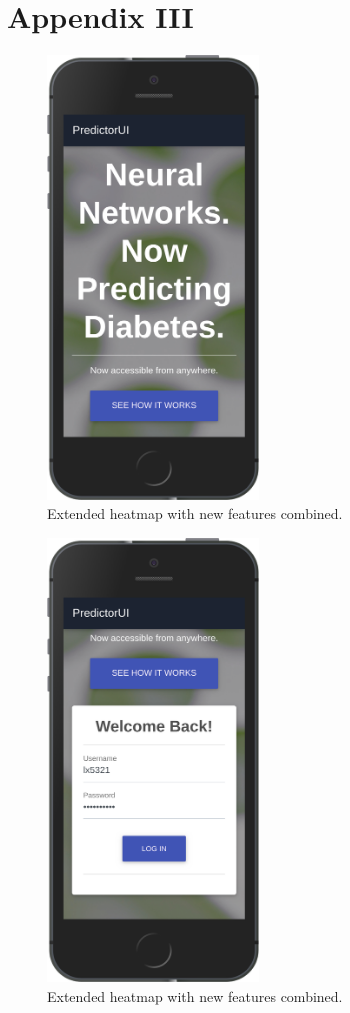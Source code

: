 \documentclass[12pt]{article}
\begin{document}
\section{Appendix III}
\begin{figure}[ht]
\centering
\includegraphics[width=0.5\textwidth]{1se.png}
\caption{\label{fig:50} Extended heatmap with new features combined.}
\end{figure}
\begin{figure}[ht]
\centering
\includegraphics[width=0.5\textwidth]{2se.png}
\caption{\label{fig:51} Extended heatmap with new features combined.}
\end{figure}
\end{document}
